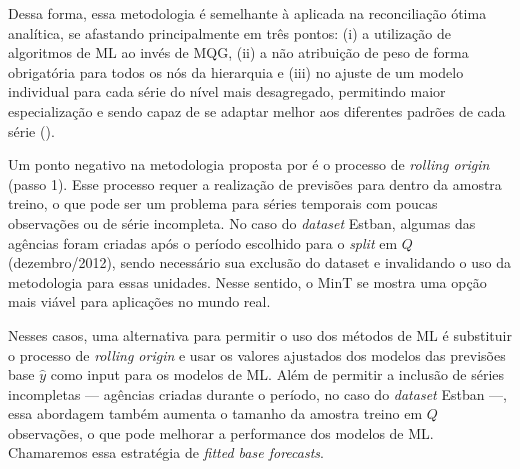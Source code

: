 \documentclass[
  12pt,
  twoside,
  openright,
  a4paper,
  chapter=TITLE,
  section=TITLE,
  brazil]{abntex2}
\begin{document}
\begin{table}

\caption{\label{tbl-modelagem}Conjunto de dados para predição dos
modelos de ML}


\end{table}%

Dessa forma, essa metodologia é semelhante à aplicada na reconciliação
ótima analítica, se afastando principalmente em três pontos: (i) a
utilização de algoritmos de ML ao invés de MQG, (ii) a não atribuição de
peso de forma obrigatória para todos os nós da hierarquia e (iii) no
ajuste de um modelo individual para cada série do nível mais
desagregado, permitindo maior especialização e sendo capaz de se adaptar
melhor aos diferentes padrões de cada série
(\textcite{spiliotis_hierarchical_2021}).

Um ponto negativo na metodologia proposta por
\textcite{spiliotis_hierarchical_2021} é o processo de \emph{rolling
origin} (passo 1). Esse processo requer a realização de previsões para
dentro da amostra treino, o que pode ser um problema para séries
temporais com poucas observações ou de série incompleta. No caso do
\emph{dataset} Estban, algumas das agências foram criadas após o período
escolhido para o \emph{split} em \(Q\) (dezembro/2012), sendo necessário
sua exclusão do dataset e invalidando o uso da metodologia para essas
unidades. Nesse sentido, o MinT se mostra uma opção mais viável para
aplicações no mundo real.

Nesses casos, uma alternativa para permitir o uso dos métodos de ML é
substituir o processo de \emph{rolling origin} e usar os valores
ajustados dos modelos das previsões base \(\hat{y}\) como input para os
modelos de ML. Além de permitir a inclusão de séries incompletas ---
agências criadas durante o período, no caso do \emph{dataset} Estban
---, essa abordagem também aumenta o tamanho da amostra treino em \(Q\)
observações, o que pode melhorar a performance dos modelos de ML.
Chamaremos essa estratégia de \emph{fitted base forecasts}.
\end{document}
